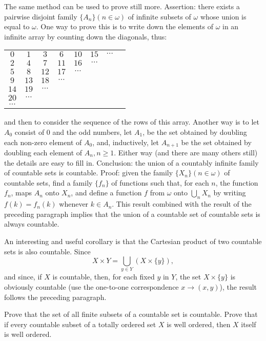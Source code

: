 The same method can be used to prove still more. Assertion: there exists a pairwise disjoint family $\{ A_{n} \} (n \in \omega)$ of infinite subsets of $\omega$ whose union is equal to $\omega$. One way to prove this is to write down the elements of $\omega$ in an infinite array by counting down the diagonals, thus: 
\begin{center}
\begin{tabular}{cccccccc}
$0$ & $1$ & $3$ & $6$ & $10$ & $15$ & $\cdots$  \\
$2$ & $4$ & $7$ & $11$ & $16$ & $\cdots$ & & \\
$5$ & $8$ & $12$ & $17$ & $\cdots$ & & & \\
$9$ & $13$ & $18$ & $\cdots$ & & & & \\
$14$ & $19$ & $\cdots$ & & & & & \\
$20$ & $\cdots$ & & & & & & \\
$\cdots $ & & & & & & & 
\end{tabular}
\end{center}
and then to consider the sequence of the rows of this array. Another way is to let $A_{0}$ consist of 0 and the odd numbers, let $A_{1}$, be the set obtained by doubling each non-zero element of $A_{0}$, and, inductively, let $A_{n+1}$ be the set obtained by doubling each element of $A_{n}, n \ge 1$. Either way (and there are many others still) the details are easy to fill in. Conclusion: the union of a countably infinite family of countable sets is countable. Proof: given the family $\{ X_{n} \} (n \in \omega)$ of countable sets, find a family $\{ f_{n} \}$ of functions such that, for each $n$, the function $f_{n}$, maps $A_{n}$ onto $X_{n}$, and define a function $f$ from $\omega$ onto $\bigcup_{n} X_{n}$ by writing $f(k) = f_{n}(k)$ whenever $k \in A_{n}$. This result combined with the result of the preceding paragraph implies that the union of a countable set of countable sets is always countable. 

An interesting and useful corollary is that the Cartesian product of two countable sets is also countable. Since 
\begin{equation*}
X \times Y = \bigcup_{y \in Y}(X \times \{ y \}),
\end{equation*}
and since, if $X$ is countable, then, for each fixed $y$ in $Y$, the set $X \times \{ y \}$ is obviously countable (use the one-to-one correspondence $x \rightarrow (x,y)$), the result follows the preceding paragraph. 

\begin{exercise} Prove that the set of all finite subsets of a countable set is countable. Prove that if every countable subset of a totally ordered set $X$ is well ordered, then $X$ itself is well ordered. 
\end{exercise}

